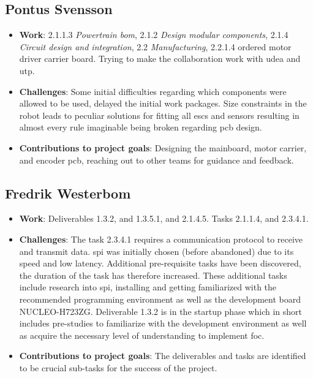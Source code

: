 \subsection*{Pontus Svensson}
\begin{itemize}
    \item \textbf{Work}: 2.1.1.3 \textit{Powertrain \acs{bom}}, 2.1.2 \textit{Design modular components}, 2.1.4 \textit{Circuit design and integration}, 2.2 \textit{Manufacturing}, 2.2.1.4 ordered motor driver carrier board. Trying to make the collaboration work with \ac{udea} and \ac{utp}.
    \item \textbf{Challenges}: Some initial difficulties regarding which components were allowed to be used, delayed the initial work packages. Size constraints in the robot leads to peculiar solutions for fitting all \acp{esc} and sensors resulting in almost every rule imaginable being broken regarding \ac{pcb} design. 
    \item \textbf{Contributions to project goals}: Designing the mainboard, motor carrier, and encoder \ac{pcb}, reaching out to other teams for guidance and feedback.  
\end{itemize}
\subsection*{Fredrik Westerbom}
\begin{itemize}
    \item \textbf{Work}: Deliverables 1.3.2, and 1.3.5.1, and 2.1.4.5. Tasks 2.1.1.4, and 2.3.4.1.
    \item \textbf{Challenges}: The task 2.3.4.1 requires a communication protocol to receive and transmit data. \ac{spi} was initially chosen (before abandoned) due to its speed and low latency. Additional pre-requisite tasks have been discovered, the duration of the task has therefore increased. These additional tasks include research into \ac{spi}, installing and getting familiarized with the recommended programming environment as well as the development board NUCLEO-H723ZG.
    Deliverable 1.3.2 is in the startup phase which in short includes pre-studies to familiarize with the development environment as well as acquire the necessary level of understanding to implement \ac{foc}.
    \item \textbf{Contributions to project goals}: The deliverables and tasks are identified to be crucial sub-tasks for the success of the project.
\end{itemize}
